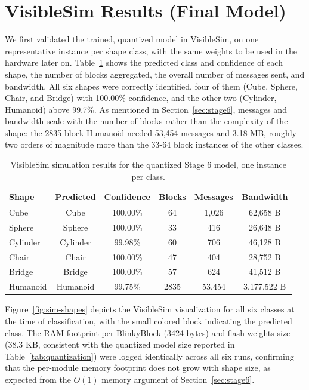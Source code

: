\documentclass[12pt,a4paper]{report}
\begin{document}
\section{VisibleSim Results (Final Model)}

We first validated the trained, quantized model in VisibleSim, on one representative instance per shape class, with the same weights to be used in the hardware later on. Table~\ref{tab:sim-results} shows the predicted class and confidence of each shape, the number of blocks aggregated, the overall number of messages sent, and bandwidth. All six shapes were correctly identified, four of them (Cube, Sphere, Chair, and Bridge) with 100.00\% confidence, and the other two (Cylinder, Humanoid) above 99.7\%. As mentioned in Section~\ref{sec:stage6}, messages and bandwidth scale with the number of blocks rather than the complexity of the shape: the 2835-block Humanoid needed 53,454 messages and 3.18 MB, roughly two orders of magnitude more than the 33-64 block instances of the other classes.

\begin{table}[H]
    \centering
    \caption{VisibleSim simulation results for the quantized Stage 6 model, one instance per class.}
    \label{tab:sim-results}
    \small
    \begin{tabular}{lccccc}
        \toprule
        Shape & Predicted & Confidence & Blocks & Messages & Bandwidth \\
        \midrule
        Cube     & Cube     & 100.00\% & 64   & 1{,}026  & 62{,}658 B \\
        Sphere   & Sphere   & 100.00\% & 33   & 416      & 26{,}648 B \\
        Cylinder & Cylinder & 99.98\%  & 60   & 706      & 46{,}128 B \\
        Chair    & Chair    & 100.00\% & 47   & 404      & 28{,}752 B \\
        Bridge   & Bridge   & 100.00\% & 57   & 624      & 41{,}512 B \\
        Humanoid & Humanoid & 99.75\%  & 2835 & 53{,}454 & 3{,}177{,}522 B \\
        \bottomrule
    \end{tabular}
\end{table}

Figure~\ref{fig:sim-shapes} depicts the VisibleSim visualization for all six classes at the time of classification, with the small colored block indicating the predicted class. The RAM footprint per BlinkyBlock (3424 bytes) and flash weights size (38.3 KB, consistent with the quantized model size reported in Table~\ref{tab:quantization}) were logged identically across all six runs, confirming that the per-module memory footprint does not grow with shape size, as expected from the $O(1)$ memory argument of Section~\ref{sec:stage6}.
\end{document}
